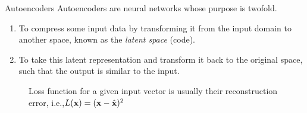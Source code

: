 \documentclass[xcolor=pdftex,dvipsnames,table,mathserif]{beamer}
\begin{document}
\begin{frame}{Autoencoders}
Autoencoders are neural networks whose purpose is twofold.
\begin{enumerate}
\item To compress some input data by transforming it from the input domain to another space,
known as the \emph{latent space} (code). 
\item To take this latent representation and transform it back to the original space, such that the output is similar to the input.
\end{enumerate}

\begin{figure}
\centering
{}
  \caption{Loss function for a given input vector is usually their reconstruction error, i.e.,$L(\mathbf{x})= ( \mathbf{x}-\hat{\mathbf{x}} )^2$}
\end{figure}

\end{frame}
\end{document}
